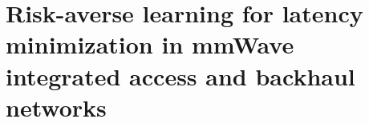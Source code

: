 

\newcommand{\sref}[1]{Section~\ref{#1}}
\newcommand{\tref}[1]{Table~\ref{#1}}

\newcommand{\ceil}[1]{\lceil{#1}\rceil}




\section{Risk-averse learning for latency minimization in mmWave integrated access and backhaul networks}
\label{sec:iab-safehaul}


